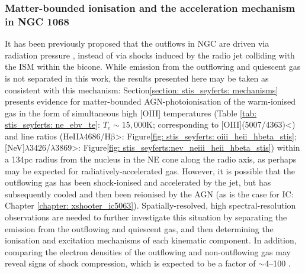 \subsubsection{Matter-bounded ionisation and the acceleration mechanism in NGC 1068}

It has been previously proposed that the outflows in NGC are driven via radiation pressure \citep{Kraemer2000II, Das2006, Revalski2021, Meena2023}, instead of via shocks induced by the radio jet colliding with the ISM within the bicone. While emission from the outflowing and quiescent gas is not separated in this work, the results presented here may be taken as consistent with this mechanism: Section\;\ref{section: stis_seyferts: mechanisms} presents evidence for matter-bounded AGN-photoionisation of the warm-ionised gas in the form of simultaneous high [OIII] temperatures (Table \ref{tab: stis_seyferts: ne_ebv_te}: $T_e\sim15,000$\;K; corresponding to [OIII](5007/4363)\;\textless{}) and line ratios (\mbox{HeII$\lambda$4686\;/\;H$\mathrm{\beta}$\;\textgreater{}}: Figure\;\ref{fig: stis_seyferts: oiii_heii_hbeta_stis}; \mbox{[NeV]$\lambda3426$\;/\;[NeIII]$\lambda$3869\;\textgreater{}}: Figure\;\ref{fig: stis_seyferts:nev_neiii_heii_hbeta_stis}) within a 134\;pc radius from the nucleus in the NE cone along the radio axis, as perhaps may be expected for radiatively-accelerated gas. However, it is possible that the outflowing gas has been shock-ionised and accelerated by the jet, but has subsequently cooled and then been reionised by the AGN (as is the case for IC: Chapter \ref{chapter: xshooter_ic5063}). Spatially-resolved, high spectral-resolution observations are needed to further investigate this situation by separating the emission from the outflowing and quiescent gas, and then determining the ionisation and excitation mechanisms of each kinematic component. In addition, comparing the electron densities of the outflowing and non-outflowing gas may reveal signs of shock compression, which is expected to be a factor of $\sim$4--100 \citep{Sutherland2017}.

